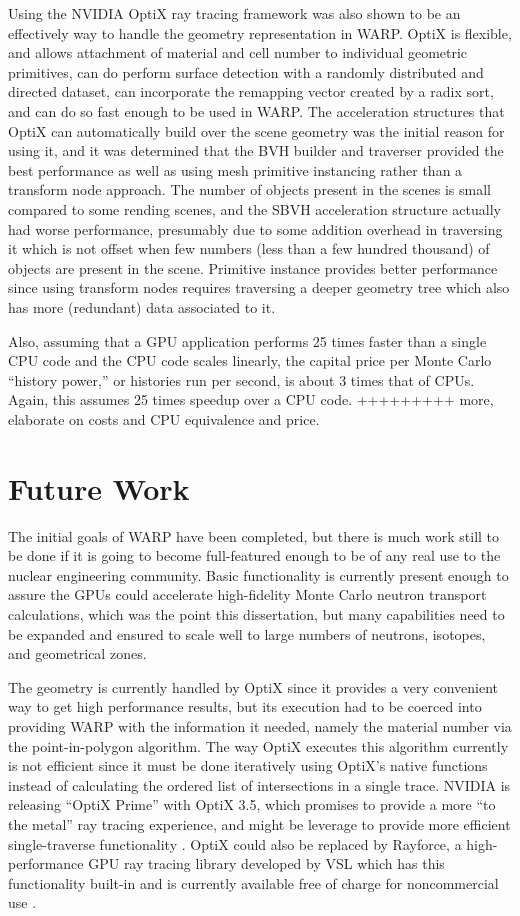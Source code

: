 Using the NVIDIA OptiX ray tracing framework was also shown to be an effectively way to handle the geometry representation in WARP.  OptiX is flexible, and allows attachment of material and cell number to individual geometric primitives, can do perform surface detection with a randomly distributed and directed dataset, can incorporate the remapping vector created by a radix sort, and can do so fast enough to be used in WARP.  The acceleration structures that OptiX can automatically build over the scene geometry was the initial reason for using it, and it was determined that the BVH builder and traverser provided the best performance as well as using mesh primitive instancing rather than a transform node approach.  The number of objects present in the scenes is small compared to some rending scenes, and the SBVH acceleration structure actually had worse performance, presumably due to some addition overhead in traversing it which is not offset when few numbers (less than a few hundred thousand) of objects are present in the scene.  Primitive instance provides better performance since using transform nodes requires traversing a deeper geometry tree which also has more (redundant) data associated to it.

Also, assuming that a GPU application performs 25 times faster than a single CPU code and the CPU code scales linearly, the capital price per Monte Carlo ``history power,'' or histories run per second, is about 3 times that of CPUs.  Again, this assumes 25 times speedup over a CPU code.  +++++++++ more, elaborate on costs and CPU equivalence and price.

\section{Future Work}

The initial goals of WARP have been completed, but there is much work still to be done if it is going to become full-featured enough to be of any real use to the nuclear engineering community.  Basic functionality is currently present enough to assure the GPUs could accelerate high-fidelity Monte Carlo neutron transport calculations, which was the point this dissertation, but many capabilities need to be expanded and ensured to scale well to large numbers of neutrons, isotopes, and geometrical zones.

The geometry is currently handled by OptiX since it provides a very convenient way to get high performance results, but its execution had to be coerced into providing WARP with the information it needed, namely the material number via the point-in-polygon algorithm.  The way OptiX executes this algorithm currently is not efficient since it must be done iteratively using OptiX's native functions instead of calculating the ordered list of intersections in a single trace.  NVIDIA is releasing ``OptiX Prime'' with OptiX 3.5, which promises to provide a more ``to the metal'' ray tracing experience, and might be leverage to provide more efficient single-traverse functionality \cite{optix3.5}.  OptiX could also be replaced by Rayforce, a high-performance GPU ray tracing library developed by VSL which has this functionality built-in and is currently available free of charge for noncommercial use \cite{rayforce}.

